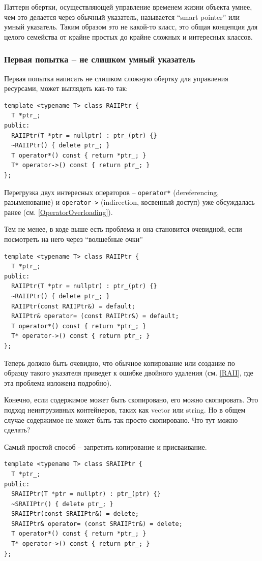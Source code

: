 \documentclass[a4paper,12pt,oneside]{article}
\begin{document}
Паттерн обертки, осуществляющей управление временем жизни объекта умнее, чем это делается через обычный указатель, называется ``smart pointer'' или умный указатель. Таким образом это не какой-то класс, это общая концепция для целого семейства от крайне простых до крайне сложных и интересных классов.

\subsubsection{Первая попытка -- не слишком умный указатель}

Первая попытка написать не слишком сложную обертку для управления ресурсами, может выглядеть как-то так:

\begin{lstlisting}
template <typename T> class RAIIPtr {
  T *ptr_;
public:
  RAIIPtr(T *ptr = nullptr) : ptr_(ptr) {}
  ~RAIIPtr() { delete ptr_; }
  T operator*() const { return *ptr_; }
  T* operator->() const { return ptr_; }
};
\end{lstlisting}

Перегрузка двух интересных операторов -- \lstinline!operator*! (dereferencing, разыменование) и \lstinline!operator->! (indirection, косвенный доступ) уже обсуждалась ранее (см. \ref{OperatorOverloading}).

Тем не менее, в коде выше есть проблема и она становится очевидной, если посмотреть на него через ``волшебные очки''

\begin{lstlisting}
template <typename T> class RAIIPtr {
  T *ptr_;
public:
  RAIIPtr(T *ptr = nullptr) : ptr_(ptr) {}
  ~RAIIPtr() { delete ptr_; }
  RAIIPtr(const RAIIPtr&) = default;
  RAIIPtr& operator= (const RAIIPtr&) = default;
  T operator*() const { return *ptr_; }
  T* operator->() const { return ptr_; }
};
\end{lstlisting}

Теперь должно быть очевидно, что обычное копирование или создание по образцу такого указателя приведет к ошибке двойного удаления (см. \ref{RAII}, где эта проблема изложена подробно). 

Конечно, если содержимое может быть скопировано, его можно скопировать. Это подход неинтрузивных контейнеров, таких как vector или string. Но в общем случае содержимое не может быть так просто скопировано. Что тут можно сделать? 

Самый простой способ -- запретить копирование и присваивание. 

\begin{lstlisting}
template <typename T> class SRAIIPtr {
  T *ptr_;
public:
  SRAIIPtr(T *ptr = nullptr) : ptr_(ptr) {}
  ~SRAIIPtr() { delete ptr_; }
  SRAIIPtr(const SRAIIPtr&) = delete;
  SRAIIPtr& operator= (const SRAIIPtr&) = delete;
  T operator*() const { return *ptr_; }
  T* operator->() const { return ptr_; }
};
\end{lstlisting}
\end{document}
